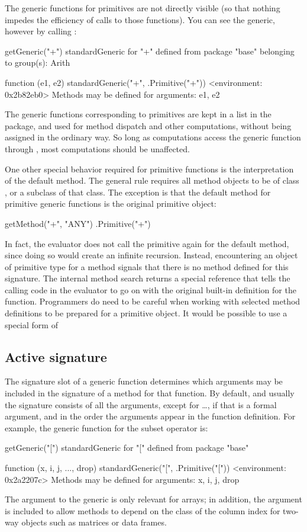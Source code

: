\documentclass[11pt]{article}
\begin{document}
The generic functions for primitives are not directly visible (so that nothing impedes the efficiency of calls to those functions).
You can see the generic, however by calling :
\begin{Example}
\SPrompt{}getGeneric("+")
standardGeneric for "+" defined from package "base"
  belonging to group(s): Arith 

function (e1, e2) 
standardGeneric("+", .Primitive("+"))
<environment: 0x2b82eb0>
Methods may be defined for arguments: e1, e2 
\end{Example}
The generic functions corresponding to primitives are kept in a list in the  package, and used for method dispatch and other computations, without being assigned in the ordinary way.
So long as computations access the generic function through , most computations should be unaffected.

One other special behavior required for primitive functions is the interpretation of the default method.
The general rule requires all method objects to be of class , or a subclass of that class.
The exception is that the default method for primitive generic functions is the original primitive object:
\begin{Example}
\SPrompt{}getMethod("+", "ANY")
.Primitive("+")
\end{Example}
In fact, the evaluator does not call the primitive again for the default method, since doing so would create an infinite recursion.
Instead, encountering an object of primitive type for a method signals that there is no method defined for this signature.
The internal method search returns a special reference that tells the calling code in the evaluator to go on with the original built-in definition for the function.
Programmers do need to be careful when working with selected method definitions to be prepared for a primitive object.
It would be possible to use a special form of 

\subsection*{Active signature}
\label{sec:active-signature}

The signature slot of a generic function determines which arguments may be included in the signature of a method for that function.
By default, and usually the signature consists of all the arguments, except for \dots{}, if that is a formal argument, and in the order the arguments appear in the function definition.
For example, the generic function for the subset operator is:
\begin{Example}
\SPrompt{}getGeneric("[")
standardGeneric for "[" defined from package "base"

function (x, i, j, ..., drop) 
standardGeneric("[", .Primitive("["))
<environment: 0x2a2207c>
Methods may be defined for arguments: x, i, j, drop 
\end{Example}
The argument  to the generic is only relevant for arrays; in addition, the argument  is included to allow methods to depend on the class of the column index for two-way objects such as matrices or data frames.
\end{document}
